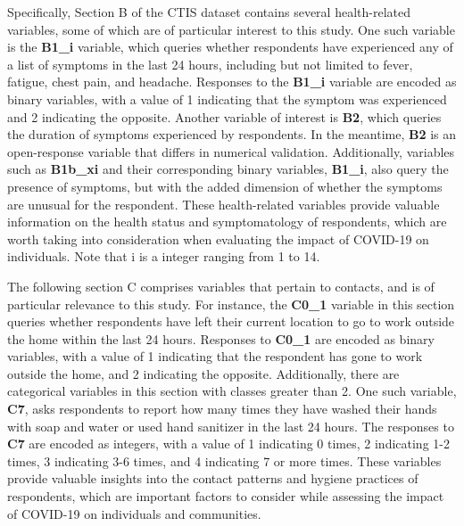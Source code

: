 Specifically, Section B of the CTIS dataset contains several health-related variables, some of which are of particular interest to this study. One such variable is the \textbf{B1\_i} variable, which queries whether respondents have experienced any of a list of symptoms in the last 24 hours, including but not limited to fever, fatigue, chest pain, and headache. Responses to the \textbf{B1\_i} variable are encoded as binary variables, with a value of 1 indicating that the symptom was experienced and 2 indicating the opposite. Another variable of interest is \textbf{B2}, which queries the duration of symptoms experienced by respondents. In the meantime, \textbf{B2} is an open-response variable that differs in numerical validation. Additionally, variables such as \textbf{B1b\_xi} and their corresponding binary variables, \textbf{B1\_i}, also query the presence of symptoms, but with the added dimension of whether the symptoms are unusual for the respondent. These health-related variables provide valuable information on the health status and symptomatology of respondents, which are worth taking into consideration when evaluating the impact of COVID-19 on individuals. Note that i is a integer ranging from 1 to 14.

The following section C comprises variables that pertain to contacts, and is of particular relevance to this study. For instance, the \textbf{C0\_1} variable in this section queries whether respondents have left their current location to go to work outside the home within the last 24 hours. Responses to \textbf{C0\_1} are encoded as binary variables, with a value of 1 indicating that the respondent has gone to work outside the home, and 2 indicating the opposite. Additionally, there are categorical variables in this section with classes greater than 2. One such variable, \textbf{C7}, asks respondents to report how many times they have washed their hands with soap and water or used hand sanitizer in the last 24 hours. The responses to \textbf{C7} are encoded as integers, with a value of 1 indicating 0 times, 2 indicating 1-2 times, 3 indicating 3-6 times, and 4 indicating 7 or more times. These variables provide valuable insights into the contact patterns and hygiene practices of respondents, which are important factors to consider while assessing the impact of COVID-19 on individuals and communities.

